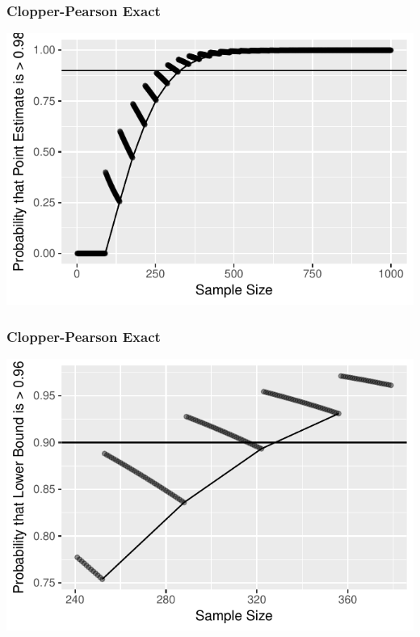 \documentclass{beamer}\usepackage{knitr}
\begin{document}
\begin{frame}
\frametitle{Clopper-Pearson Exact}
\begin{knitrout}
\color{fgcolor}

{\centering \includegraphics[width=\linewidth]{figure/plot_Exact_2-1} 

}



\end{knitrout}
\end{frame}

\begin{frame}
\frametitle{Clopper-Pearson Exact}
\begin{knitrout}
\color{fgcolor}

{\centering \includegraphics[width=\linewidth]{figure/plot_Exact_3-1} 

}



\end{knitrout}
\end{frame}
\end{document}

